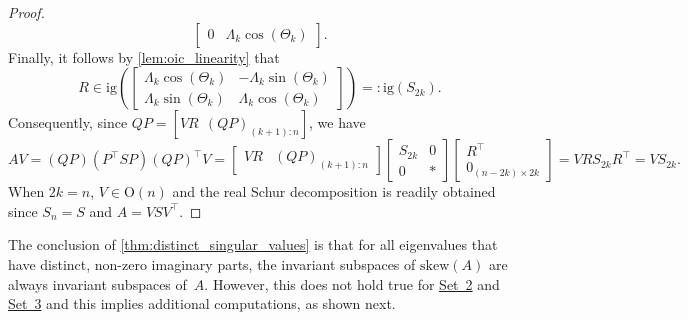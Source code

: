 \documentclass[10pt,twoside,dvipsnames]{siamart1116}
\numberwithin{algorithm}{section}
\numberwithin{equation}{section}
\newcommand{\wordref}[2]{\hyperlink{#1}{#2}}
\begin{document}
\begin{proof}
\begin{equation*}
\begin{bmatrix}
		0&\Lambda_k\cos(\Theta_k)
	\end{bmatrix}.
\end{equation*}%
	Finally, it follows by \cref{lem:oic_linearity} that \begin{equation*}
	R\in \mathrm{ig}\left(\begin{bmatrix}
	\Lambda_k\cos(\Theta_k)&-\Lambda_k\sin(\Theta_k)\\
	 \Lambda_k\sin(\Theta_k)&\Lambda_k\cos(\Theta_k)
	\end{bmatrix}\right)=: \mathrm{ig}(S_{2k}).
	\end{equation*} 
	Consequently, since $QP = [VR\ \ (QP)_{(k+1):n}]$, we have
	\begin{equation*}
		AV = (QP)(P^\top SP) (QP)^\top V =\begin{bmatrix}VR& (QP)_{(k+1):n}\end{bmatrix}\begin{bmatrix}
		S_{2k}&0\\
		0&*
		\end{bmatrix}\begin{bmatrix}
		R^\top \\
		0_{(n-2k)\times 2k}
\end{bmatrix}		 = V RS_{2k}R^\top  = V S_{2k}.
	\end{equation*}
	When $2k=n$, $V\in\mathrm{O}(n)$ and the real Schur decomposition is readily obtained since $S_n=S$ and $A=VSV^\top $. %
	\end{proof}
	The conclusion of \cref{thm:distinct_singular_values} is that for all eigenvalues that have distinct, non-zero imaginary parts, the invariant subspaces of $\mathrm{skew}(A)$ are always invariant subspaces of~$A$. However, this does not hold true for \wordref{set2}{Set~2} and \wordref{set3}{Set~3} and this implies additional computations, as shown next.
\end{document}
